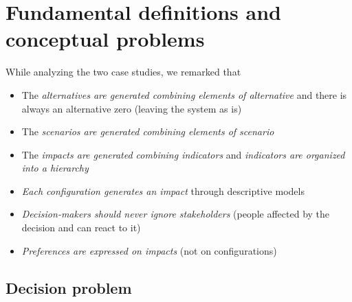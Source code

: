 \chapter{Fundamental definitions and conceptual problems}
\label{ch:fundamentaldefinitions}

While analyzing the two case studies, we remarked that
\begin{itemize}
	\item The \textit{alternatives are generated combining elements of alternative} and there is always an alternative zero (leaving the system as is)
	
	\item The \textit{scenarios are generated combining elements of scenario}
	
	\item The \textit{impacts are generated combining indicators} and \textit{indicators are organized into a hierarchy}
	
	\item \textit{Each configuration generates an impact} through descriptive models
	
	\item \textit{Decision-makers should never ignore stakeholders} (people affected by the decision and can react to it)
	
	\item \textit{Preferences are expressed on impacts} (not on configurations)
\end{itemize}

\section{Decision problem}
\label{sec:decproblemdef}

